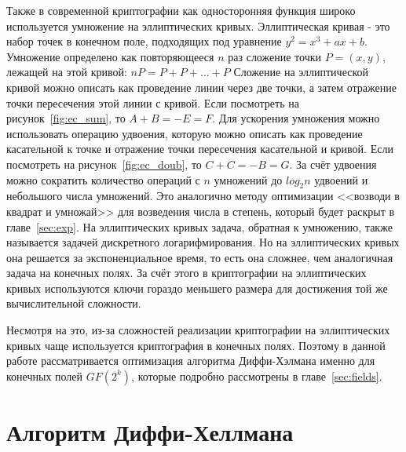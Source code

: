\documentclass[times,specification,annotation]{itmo-student-thesis}
\begin{document}
Также в современной криптографии как односторонняя функция широко используется умножение на эллиптических кривых.
Эллиптическая кривая - это набор точек в конечном поле, подходящих под уравнение $y^2=x^3+ax+b$.
Умножение определено как повторяющееся $n$ раз сложение точки $P=(x,y)$, лежащей на этой кривой: $nP=P+P+\dots+P$
Сложение на эллиптической кривой можно описать как проведение линии через две точки, а затем отражение точки пересечения этой линии с кривой.
Если посмотреть на рисунок~\ref{fig:ec_sum}, то $A+B=-E=F$.
Для ускорения умножения можно использовать операцию удвоения, которую можно описать как проведение касательной к точке и
отражение точки пересечения касательной и кривой.
Если посмотреть на рисунок~\ref{fig:ec_doub}, то $C+C=-B=G$.
За счёт удвоения можно сократить количество операций с $n$ умножений до $log_2 n$ удвоений и небольшого числа умножений.
Это аналогично методу оптимизации <<возводи в квадрат и умножай>> для возведения числа в степень, который будет раскрыт в главе~\ref{sec:exp}.
На эллиптических кривых задача, обратная к умножению, также называется задачей дискретного логарифмирования.
Но на эллиптических кривых она решается за экспоненциальное время, то есть она сложнее, чем аналогичная задача на конечных полях.
За счёт этого в криптографии на эллиптических кривых используются ключи гораздо меньшего размера для достижения той же вычислительной сложности.\par
Несмотря на это, из-за сложностей реализации криптографии на эллиптических кривых чаще используется криптография в конечных полях.
Поэтому в данной работе рассматривается оптимизация алгоритма Диффи-Хэлмана именно для конечных полей $GF(2^k)$, которые подробно рассмотрены в главе~\ref{sec:fields}.


\section{Алгоритм Диффи-Хеллмана}\label{sec:dhke}
\end{document}
